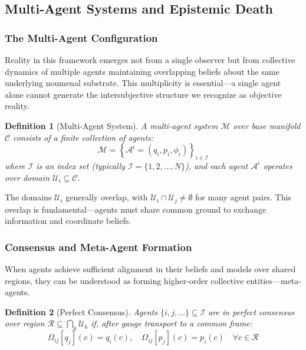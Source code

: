 \documentclass[11pt]{article}
\newtheorem{definition}{Definition}
\begin{document}
\subsection{Multi-Agent Systems and Epistemic Death}

\subsubsection{The Multi-Agent Configuration}

Reality in this framework emerges not from a single observer but from collective dynamics of multiple agents maintaining overlapping beliefs about the same underlying noumenal substrate. This multiplicity is essential---a single agent alone cannot generate the intersubjective structure we recognize as objective reality.

\begin{definition}[Multi-Agent System]
A multi-agent system $\mathcal{M}$ over base manifold $\mathcal{C}$ consists of a finite collection of agents:
\begin{equation}
\mathcal{M} = \left\{\mathcal{A}^i = (q_i, p_i, \phi_i)\right\}_{i \in \mathcal{I}}
\end{equation}
where $\mathcal{I}$ is an index set (typically $\mathcal{I} = \{1, 2, \ldots, N\}$), and each agent $\mathcal{A}^i$ operates over domain $\mathcal{U}_i \subseteq \mathcal{C}$.
\end{definition}

The domains $\mathcal{U}_i$ generally overlap, with $\mathcal{U}_i \cap \mathcal{U}_j \neq \emptyset$ for many agent pairs. This overlap is fundamental---agents must share common ground to exchange information and coordinate beliefs.

\subsubsection{Consensus and Meta-Agent Formation}

When agents achieve sufficient alignment in their beliefs and models over shared regions, they can be understood as forming higher-order collective entities---meta-agents.

\begin{definition}[Perfect Consensus]
Agents $\{i, j, \ldots\} \subseteq \mathcal{I}$ are in perfect consensus over region $\mathcal{R} \subseteq \bigcap_k \mathcal{U}_k$ if, after gauge transport to a common frame:
\begin{equation}
\Omega_{ij}[q_j](c) = q_i(c), \quad \Omega_{ij}[p_j](c) = p_i(c) \quad \forall c \in \mathcal{R}
\end{equation}
\end{definition}
\end{document}

